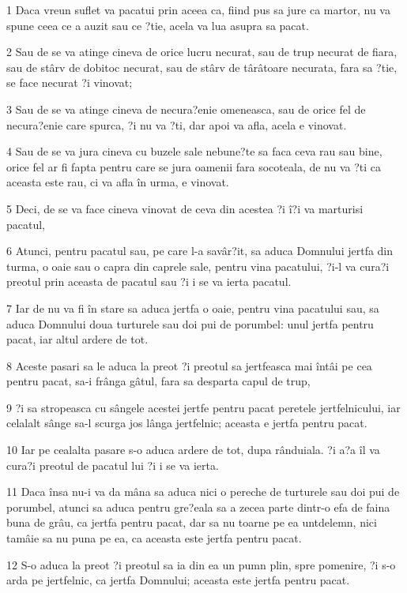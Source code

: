 \par 1 Daca vreun suflet va pacatui prin aceea ca, fiind pus sa jure ca martor, nu va spune ceea ce a auzit sau ce ?tie, acela va lua asupra sa pacat.
\par 2 Sau de se va atinge cineva de orice lucru necurat, sau de trup necurat de fiara, sau de stârv de dobitoc necurat, sau de stârv de târâtoare necurata, fara sa ?tie, se face necurat ?i vinovat;
\par 3 Sau de se va atinge cineva de necura?enie omeneasca, sau de orice fel de necura?enie care spurca, ?i nu va ?ti, dar apoi va afla, acela e vinovat.
\par 4 Sau de se va jura cineva cu buzele sale nebune?te sa faca ceva rau sau bine, orice fel ar fi fapta pentru care se jura oamenii fara socoteala, de nu va ?ti ca aceasta este rau, ci va afla în urma, e vinovat.
\par 5 Deci, de se va face cineva vinovat de ceva din acestea ?i î?i va marturisi pacatul,
\par 6 Atunci, pentru pacatul sau, pe care l-a savâr?it, sa aduca Domnului jertfa din turma, o oaie sau o capra din caprele sale, pentru vina pacatului, ?i-l va cura?i preotul prin aceasta de pacatul sau ?i i se va ierta pacatul.
\par 7 Iar de nu va fi în stare sa aduca jertfa o oaie, pentru vina pacatului sau, sa aduca Domnului doua turturele sau doi pui de porumbel: unul jertfa pentru pacat, iar altul ardere de tot.
\par 8 Aceste pasari sa le aduca la preot ?i preotul sa jertfeasca mai întâi pe cea pentru pacat, sa-i frânga gâtul, fara sa desparta capul de trup,
\par 9 ?i sa stropeasca cu sângele acestei jertfe pentru pacat peretele jertfelnicului, iar celalalt sânge sa-l scurga jos lânga jertfelnic; aceasta e jertfa pentru pacat.
\par 10 Iar pe cealalta pasare s-o aduca ardere de tot, dupa rânduiala. ?i a?a îl va cura?i preotul de pacatul lui ?i i se va ierta.
\par 11 Daca însa nu-i va da mâna sa aduca nici o pereche de turturele sau doi pui de porumbel, atunci sa aduca pentru gre?eala sa a zecea parte dintr-o efa de faina buna de grâu, ca jertfa pentru pacat, dar sa nu toarne pe ea untdelemn, nici tamâie sa nu puna pe ea, ca aceasta este jertfa pentru pacat.
\par 12 S-o aduca la preot ?i preotul sa ia din ea un pumn plin, spre pomenire, ?i s-o arda pe jertfelnic, ca jertfa Domnului; aceasta este jertfa pentru pacat.
